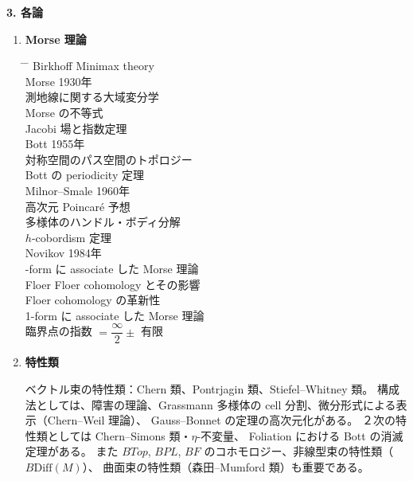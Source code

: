 \documentclass[uplatex,dvipdfmx]{jlreq}
\begin{document}
\bigskip
\noindent\textbf{3. 各論}

\begin{enumerate}
  \item \textbf{Morse 理論}

  \begin{tabbing}
    \hspace{1cm} \= \hspace{3cm} \= \hspace{8cm} \kill
    \> Birkhoff \> Minimax theory \\
    \> Morse \> 1930年 \\
    \> \> 測地線に関する大域変分学 \\
    \> \> Morse の不等式 \\
    \> \> Jacobi 場と指数定理 \\
    \> Bott \> 1955年 \\
    \> \> 対称空間のパス空間のトポロジー \\
    \> \> Bott の periodicity 定理 \\
    \> Milnor--Smale \> 1960年 \\
    \> \> 高次元 Poincaré 予想 \\
    \> \> 多様体のハンドル・ボディ分解 \\
    \> \> $h$-cobordism 定理 \\
    \> Novikov \> 1984年 \\
    \> -form に associate した Morse 理論 \\
    \> Floer \> Floer cohomology とその影響 \\
    \> \> Floer cohomology の革新性 \\
    \> \> \hspace{1cm}1-form に associate した Morse 理論 \\
    \> \> \hspace{1cm}臨界点の指数 $= \dfrac{\infty}{2} \pm$ 有限
  \end{tabbing}

  \item \textbf{特性類}

  ベクトル束の特性類：Chern 類、Pontrjagin 類、Stiefel--Whitney 類。
  構成法としては、障害の理論、Grassmann 多様体の cell 分割、微分形式による表示（Chern--Weil 理論）、
  Gauss--Bonnet の定理の高次元化がある。
  ２次の特性類としては Chern--Simons 類・$\eta$-不変量、
  Foliation における Bott の消滅定理がある。
  また $BTop$, $BPL$, $BF$ のコホモロジー、非線型束の特性類（$B\mathrm{Diff}(M)$）、
  曲面束の特性類（森田--Mumford 類）も重要である。


\end{enumerate}
\end{document}
